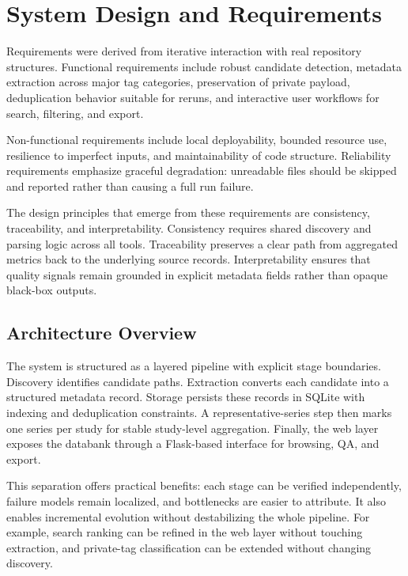 \chapter{System Design and Requirements}

Requirements were derived from iterative interaction with real repository structures. Functional requirements include robust candidate detection, metadata extraction across major tag categories, preservation of private payload, deduplication behavior suitable for reruns, and interactive user workflows for search, filtering, and export.

Non-functional requirements include local deployability, bounded resource use, resilience to imperfect inputs, and maintainability of code structure. Reliability requirements emphasize graceful degradation: unreadable files should be skipped and reported rather than causing a full run failure.

The design principles that emerge from these requirements are consistency, traceability, and interpretability. Consistency requires shared discovery and parsing logic across all tools. Traceability preserves a clear path from aggregated metrics back to the underlying source records. Interpretability ensures that quality signals remain grounded in explicit metadata fields rather than opaque black-box outputs.

\section{Architecture Overview}

The system is structured as a layered pipeline with explicit stage boundaries. Discovery identifies candidate paths. Extraction converts each candidate into a structured metadata record. Storage persists these records in SQLite with indexing and deduplication constraints. A representative-series step then marks one series per study for stable study-level aggregation. Finally, the web layer exposes the databank through a Flask-based interface for browsing, QA, and export.

This separation offers practical benefits: each stage can be verified independently, failure models remain localized, and bottlenecks are easier to attribute. It also enables incremental evolution without destabilizing the whole pipeline. For example, search ranking can be refined in the web layer without touching extraction, and private-tag classification can be extended without changing discovery.

